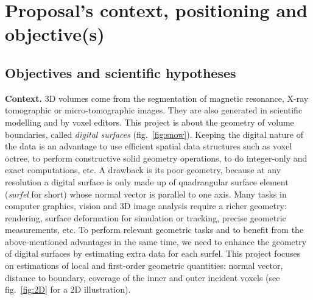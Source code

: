 \section{Proposal's context, positioning and objective(s)}
\label{sec:context}

\subsection{Objectives and scientific hypotheses}


\noindent\textbf{Context.}
3D volumes come from the segmentation of magnetic resonance, X-ray tomographic or micro-tomographic images. 
They are also generated in scientific modelling and by voxel editors. 
This project is about the geometry of volume boundaries, called \emph{digital surfaces} (fig.~\ref{fig:snow}). 
Keeping the digital nature of the data is an advantage
to use efficient spatial data structures such as voxel octree, 
to perform constructive solid geometry operations,
to do integer-only and exact computations, etc.
A drawback is its poor geometry, because at any resolution a digital surface is only 
made up of quadrangular surface element (\emph{surfel} for short) 
whose normal vector is parallel to one axis. 
Many tasks in computer graphics, vision and 3D image analysis require a richer geometry: 
rendering, surface deformation for simulation or tracking, precise geometric measurements, etc.
To perform relevant geometric tasks and 
to benefit from the above-mentioned advantages in the same time, 
we need to enhance the geometry of digital surfaces by estimating extra data for each surfel. 
This project focuses on estimations of local and first-order geometric quantities: 
normal vector, distance to boundary, coverage of the inner and outer incident voxels 
(see fig.~\ref{fig:2D} for a 2D illustration).  

